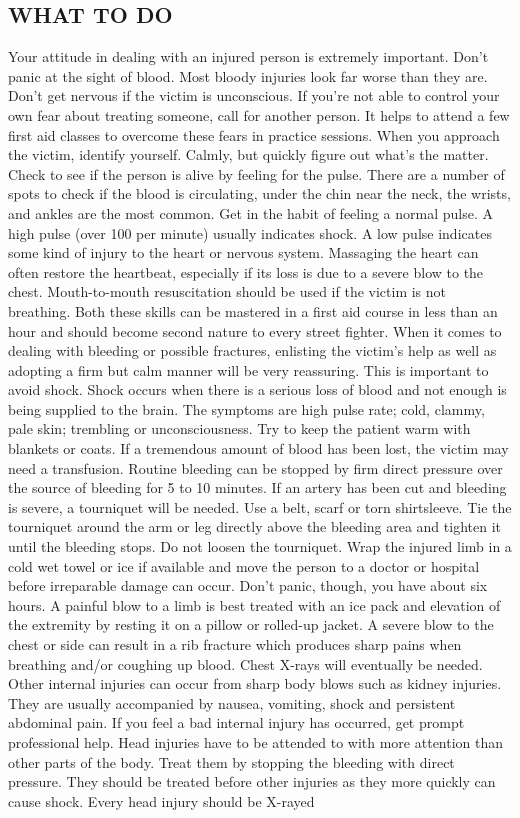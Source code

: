\documentclass[11pt,twoside,a4paper]{book}
\begin{document}
\subsection{WHAT TO DO}

Your attitude in dealing with an injured person is extremely important. Don't panic at the sight of blood. Most bloody injuries look far worse than they are. Don't get nervous if the victim is unconscious. If you're not able to control your own fear about treating someone, call for another person. It helps to attend a few first aid classes to overcome these fears in practice sessions. When you approach the victim, identify yourself. Calmly, but quickly figure out what's the matter. Check to see if the person is alive by feeling for the pulse. There are a number of spots to check if the blood is circulating, under the chin near the neck, the wrists, and ankles are the most common. Get in the habit of feeling a normal pulse. A high pulse (over 100 per minute) usually indicates shock. A low pulse indicates some kind of injury to the heart or nervous system. Massaging the heart can often restore the heartbeat, especially if its loss is due to a severe blow to the chest. Mouth-to-mouth resuscitation should be used if the victim is not breathing. Both these skills can be mastered in a first aid course in less than an hour and should become second nature to every street fighter. When it comes to dealing with bleeding or possible fractures, enlisting the victim's help as well as adopting a firm but calm manner will be very reassuring. This is important to avoid shock. Shock occurs when there is a serious loss of blood and not enough is being supplied to the brain. The symptoms are high pulse rate; cold, clammy, pale skin; trembling or unconsciousness. Try to keep the patient warm with blankets or coats. If a tremendous amount of blood has been lost, the victim may need a transfusion. Routine bleeding can be stopped by firm direct pressure over the source of bleeding for 5 to 10 minutes. If an artery has been cut and bleeding is severe, a tourniquet will be needed. Use a belt, scarf or torn shirtsleeve. Tie the tourniquet around the arm or leg directly above the bleeding area and tighten it until the bleeding stops. Do not loosen the tourniquet. Wrap the injured limb in a cold wet towel or ice if available and move the person to a doctor or hospital before irreparable damage can occur. Don't panic, though, you have about six hours. A painful blow to a limb is best treated with an ice pack and elevation of the extremity by resting it on a pillow or rolled-up jacket. A severe blow to the chest or side can result in a rib fracture which produces sharp pains when breathing and/or coughing up blood. Chest X-rays will eventually be needed. Other internal injuries can occur from sharp body blows such as kidney injuries. They are usually accompanied by nausea, vomiting, shock and persistent abdominal pain. If you feel a bad internal injury has occurred, get prompt professional help. Head injuries have to be attended to with more attention than other parts of the body. Treat them by stopping the bleeding with direct pressure. They should be treated before other injuries as they more quickly can cause shock. Every head injury should be X-rayed 
\end{document}
